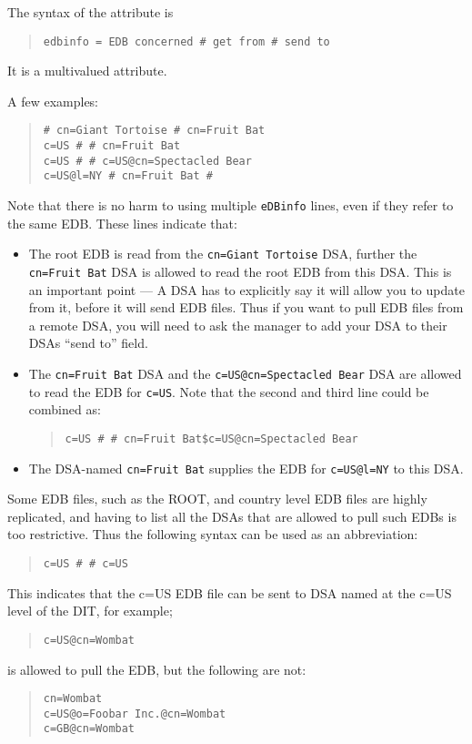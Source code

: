 The syntax of the attribute is 
\begin{quote}\begin{verbatim}
edbinfo = EDB concerned # get from # send to
\end{verbatim}\end{quote}
It is a multivalued attribute. 

A few examples:
\begin{quote}\small\begin{verbatim}
# cn=Giant Tortoise # cn=Fruit Bat
c=US # # cn=Fruit Bat
c=US # # c=US@cn=Spectacled Bear
c=US@l=NY # cn=Fruit Bat #
\end{verbatim}\end{quote}
Note that there is no harm to using multiple \verb"eDBinfo" lines,
even if they refer to the same EDB.
These lines indicate that:
\begin{itemize}
\item	The root EDB is read from the \verb"cn=Giant Tortoise" DSA,
	further the \verb"cn=Fruit Bat" DSA is allowed to read the
	root EDB from this DSA.
	This is an important point --- A DSA has to explicitly say it will
	allow you to update from it, before it will send EDB files.
	Thus if you want to pull EDB files from a remote DSA, you will need
	to ask the manager to add your DSA to their DSAs ``send to'' field.

\item	The \verb"cn=Fruit Bat" DSA and the \verb"c=US@cn=Spectacled Bear" DSA
	are allowed to read the EDB for \verb"c=US". 
	Note that the second and third line could be combined as:
\begin{quote}\small\begin{verbatim}
c=US # # cn=Fruit Bat$c=US@cn=Spectacled Bear
\end{verbatim}\end{quote}
\item	The DSA-named \verb"cn=Fruit Bat" supplies the EDB for \verb"c=US@l=NY"
	to this DSA.
\end{itemize}

Some EDB files, such as the ROOT, and country level EDB files are highly
replicated, and having to list all the DSAs that are allowed to pull such EDBs
is too restrictive.
Thus the following syntax can be used as an abbreviation:
\begin{quote}\small\begin{verbatim}
c=US # # c=US
\end{verbatim}\end{quote}
This indicates that the c=US EDB file can be sent to DSA named at the c=US
level of the DIT, for example;
\begin{quote}\small\begin{verbatim}
c=US@cn=Wombat
\end{verbatim}\end{quote}
is allowed to pull the EDB, but the following are not:
\begin{quote}\small\begin{verbatim}
cn=Wombat
c=US@o=Foobar Inc.@cn=Wombat
c=GB@cn=Wombat
\end{verbatim}\end{quote}

